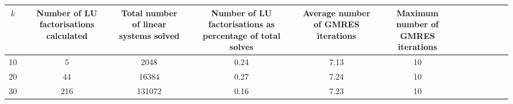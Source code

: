 \begin{tabular}{Sc Sc Sc Sc Sc Sc}
\toprule

$k$ & Number of LU factorisations calculated & Total number of linear systems solved & Number of LU factorisations as percentage of total solves & Average number of GMRES iterations & Maximum number of GMRES iterations \\

\midrule

10 &                                      5 &                                  2048 &                                               0.24 &                               7.13 &                                 10 \\

20 &                                     44 &                                 16384 &                                               0.27 &                               7.24 &                                 10 \\

30 &                                    216 &                                131072 &                                               0.16 &                               7.23 &                                 10 \\

\bottomrule

\end{tabular}

